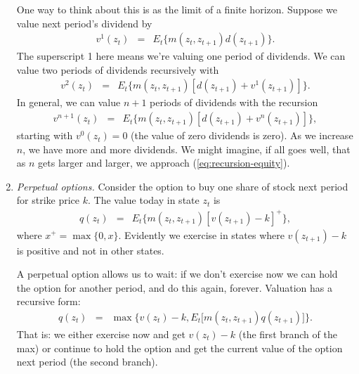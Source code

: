 \documentclass[11pt]{article}
\begin{document}
\begin{enumerate}
One way to think about this is as the limit of a finite horizon.
Suppose we value next period's dividend by
\begin{eqnarray*}
    v^1(z_t) &=& E_t \big\{ m(z_t,z_{t+1}) d(z_{t+1}) \big\} .
\end{eqnarray*}
The superscript 1 here means we're valuing one period of dividends.
We can value two periods of dividends recursively with
\begin{eqnarray*}
    v^2(z_t) &=& E_t \big\{ m(z_t,z_{t+1}) [d(z_{t+1}) + v^1(z_{t+1})] \big\} .
\end{eqnarray*}
In general, we can value $n+1$ periods of dividends with the recursion
\begin{eqnarray*}
    v^{n+1}(z_t) &=& E_t \big\{ m(z_t,z_{t+1}) [d(z_{t+1}) + v^n(z_{t+1})] \big\} ,
    \label{eq:recursion-equity-n}
\end{eqnarray*}
starting with $v^0(z_t) = 0$ (the value of zero dividends is zero).
As we increase $n$, we have more and more dividends.
We might imagine, if all goes well, that as $n$ gets larger and larger,
we approach (\ref{eq:recursion-equity}).

\begin{comment}
Unlike bond pricing, loglinear examples don't work.
There are some popular loglinear approximations, but that's too much work for now.
We can, however, adapt the Markov chain setup we used with bonds.
Suppose the dividend is a vector $d$, with one element for each state.
Then the pricing relation (\ref{eq:recursion-equity}) becomes
\begin{eqnarray*}
    v &=& B (d+v) .
\end{eqnarray*}
The solution is $ v = (I-B)^{-1} B d$.
Alternatively, we can substitute repeatedly to get
$ v = B d + B^2 d + B^3 d + \cdots $,
the present discounted value version of the equity price.
\end{comment}

\item {\it Perpetual options.\/}
Consider the option to buy one share of stock next period for strike price $k$.
The value today in state $z_t$ is
\begin{eqnarray*}
    q(z_t) &=& E_t \big\{ m(z_t,z_{t+1}) [v(z_{t+1}) - k]^+ \big\} ,
\end{eqnarray*}
where $x^+ = \max \{0, x \} $.
Evidently we exercise in states where $ v(z_{t+1}) - k$ is positive
and not in other states.

A perpetual option allows us to wait:  if we don't exercise now
we can hold the option for another period, and do this again, forever.
Valuation has a recursive form:
\begin{eqnarray*}
    q(z_t) &=& \max \big\{ v(z_{t}) - k, E_t \big[ m(z_t,z_{t+1}) q(z_{t+1})\big] \big\} .
\end{eqnarray*}
That is:  we either exercise now and get $v(z_t)-k$ (the first branch
of the max) or continue to hold the option and get the current value of the option
next period (the second branch).


\end{enumerate}
\end{document}
